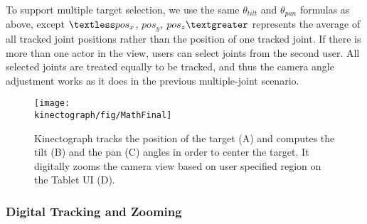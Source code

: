 
To support multiple target selection, we use the same $\theta_{tilt}$ and $\theta_{pan}$ formulas as above, except $\textless pos_{x}$, $pos_{y}$, $pos_{z} \textgreater$ represents the average of all tracked joint positions rather than the position of one tracked joint.
%
If there is more than one actor in the view, users can select joints from the second user. All selected joints are treated equally to be tracked, and thus the camera angle adjustment works as it does in the previous multiple-joint scenario.


\begin{figure}[t]
\centering
\texttt{[image: \\kinectograph/fig/MathFinal]}
\caption{Kinectograph tracks the position of the target (A) and computes the tilt (B) and the pan (C) angles in order to center the target. It digitally zooms the camera view based on user specified region on the Tablet UI (D).}
\label{fig:math}
\end{figure}

\subsubsection{Digital Tracking and Zooming}


